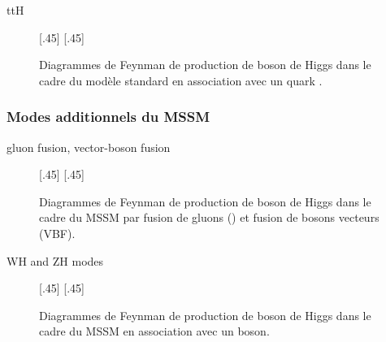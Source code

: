ttH
\begin{figure}[h]
\centering
\vspace{\baselineskip}
\subcaptionbox{\label{subfig-fgraph-Higgs_with_t_qq_g_tth}}[.45\textwidth]
{\vspace{\baselineskip}}
\hfill
\subcaptionbox{\label{subfig-fgraph-Higgs_with_t_gg_htt}}[.45\textwidth]
{\vspace{\baselineskip}}

\caption[Production de boson de Higgs en association avec un quark \quarkt.]{Diagrammes de Feynman de production de boson de Higgs dans le cadre du modèle standard en association avec un quark \quarkt.}
\label{fig-fgraph-Higgs_prod_with_t}
\end{figure}

\subsubsection{Modes additionnels du MSSM}
gluon fusion, vector-boson fusion
\begin{figure}[h]
\centering
\vspace{\baselineskip}
[.45\textwidth]
{\vspace{\baselineskip}}
\hfill
{}[.45\textwidth]
{\vspace{\baselineskip}}
\caption[Production de boson de Higgs par fusion de gluons et de bosons vecteurs.]{Diagrammes de Feynman de production de boson de Higgs dans le cadre du MSSM par fusion de gluons (\gluon\gluon\Higgs) et fusion de bosons vecteurs (VBF).}
\label{fig-fgraph-Higgs_prod_ggh_VBF-MSSM}
\end{figure}


WH and ZH modes
\begin{figure}[h]
\centering
\vspace{\baselineskip}
[.45\textwidth]
{\vspace{\baselineskip}}
\hfill
{}[.45\textwidth]
{\vspace{\baselineskip}}
\caption[Production de boson de Higgs en association avec un boson.]{Diagrammes de Feynman de production de boson de Higgs dans le cadre du MSSM en association avec un boson.}
\label{fig-fgraph-Higgs_prod_VH_ggZh-MSSM}
\end{figure}

